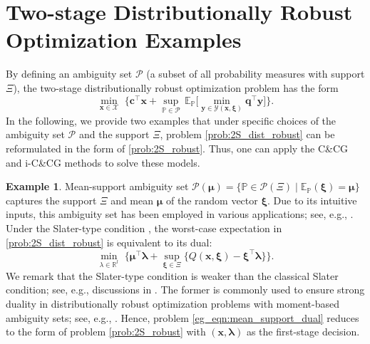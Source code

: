 \documentclass[preprint,review,11pt]{elsarticle}
\theoremstyle{definition}
\newtheorem{example}{Example}%
\theoremstyle{remark}
\newcommand{\tp}{\top}
\newcommand{\E}{\mathbb{E}}
\newcommand{\Prob}{\mathbb{P}}
\newcommand{\R}{\mathbb{R}}
\newcommand{\calP}{\mathcal{P}}
\newcommand{\calX}{\mathcal{X}}
\newcommand{\calY}{\mathcal{Y}}
\newcommand{\xb}{\pmb{x}}
\newcommand{\yb}{\pmb{y}}
\newcommand{\cb}{\pmb{c}}
\newcommand{\qb}{\pmb{q}}
\newcommand{\xib}{\pmb{\xi}}
\newcommand{\mub}{\pmb{\mu}}
\newcommand{\lambdab}{\pmb{\lambda}}
\begin{document}
\section{Two-stage Distributionally Robust Optimization Examples} \label{appdx:DRO}

By defining an ambiguity set $\calP$ (a subset of all probability measures with support $\Xi$), the two-stage distributionally robust optimization problem has the form
%
\begin{equation} \label{prob:2S_dist_robust}
    \min_{\xb\in\calX}\,\,\bigg\{ \cb^\tp \xb + \sup_{\Prob\in\calP} \, \E_{\Prob} \bigg[ \min_{\yb\in\calY(\xb,\xib)} \qb^\tp \yb  \bigg] \bigg\}.
\end{equation}
%
In the following, we provide two examples that under specific choices of the ambiguity set $\calP$ and the support $\Xi$, problem \eqref{prob:2S_dist_robust} can be reformulated in the form of \eqref{prob:2S_robust}. Thus, one can apply the C\&CG and i-C\&CG methods to solve these models.

\begin{example} \label{eg:mean_support_ambig}
Mean-support ambiguity set $\calP(\mub)=\{\Prob\in\calP(\Xi)\mid \E_\Prob(\xib)=\mub\}$ captures the support $\Xi$ and mean $\mub$ of the random vector $\xib$. Due to its intuitive inputs, this ambiguity set has been employed in various applications; see, e.g., . Under the Slater-type condition , the worst-case expectation in \eqref{prob:2S_dist_robust} is equivalent to its dual:
%
\begin{equation} \label{eg_eqn:mean_support_dual}
    \min_{\lambda\in\R^l}\,\, \bigg\{\mub^\tp\lambdab + \sup_{\xib\in\Xi}\bigg\{ Q(\xb,\xib)-\xib^\tp\lambdab \bigg\} \bigg\}.
\end{equation}
%
We remark that the Slater-type condition is weaker than the classical Slater condition; see, e.g., discussions in . The former is commonly used to ensure strong duality in distributionally robust optimization problems with moment-based ambiguity sets; see, e.g., . Hence, problem \eqref{eg_eqn:mean_support_dual} reduces to the form of problem \eqref{prob:2S_robust} with $(\xb,\lambdab)$ as the first-stage decision. 
\end{example}
\end{document}
